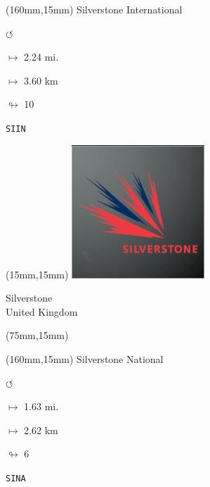 \begin{textblock*}{40mm}(160mm,15mm)%
Silverstone International
\par \Huge$\circlearrowleft$
\Large
\par$\mapsto$ 2.24 mi.
\par$\mapsto$ 3.60 km
\par$\looparrowright$ 10
\par\hfill\tiny\tt SIIN\\
\end{textblock*}
\null\newpage

\begin{textblock*}{50mm}(15mm,15mm)%
\includegraphics[width=50mm]{LG/2015-05-20_00094.png}
\par Silverstone\\ United Kingdom
\end{textblock*}
\begin{textblock*}{80mm}(75mm,15mm)%
\end{textblock*}
\begin{textblock*}{40mm}(160mm,15mm)%
Silverstone National
\par \Huge$\circlearrowleft$
\Large
\par$\mapsto$ 1.63 mi.
\par$\mapsto$ 2.62 km
\par$\looparrowright$ 6
\par\hfill\tiny\tt SINA\\
\end{textblock*}
